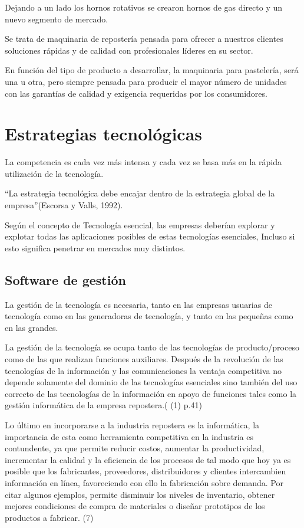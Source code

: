 \documentclass{bmcart}
\begin{document}
Dejando a un lado los hornos rotativos se crearon hornos de gas directo y un nuevo segmento de mercado.

Se trata de maquinaria de repostería pensada para ofrecer a nuestros clientes soluciones rápidas y de calidad con profesionales líderes en su sector. 

En función del tipo de producto a desarrollar, la maquinaria para pastelería, será una u otra, pero siempre pensada para producir el mayor número de unidades con las garantías de calidad y exigencia requeridas por los consumidores.

\section{Estrategias tecnológicas}
La competencia es cada vez más intensa y cada vez se basa más en la rápida utilización de la tecnología.

“La estrategia tecnológica debe encajar dentro de la estrategia global de la empresa”(Escorsa y Valls, 1992).

Según el concepto de Tecnología esencial, las empresas deberían explorar y explotar todas las aplicaciones posibles de estas tecnologías esenciales, Incluso si esto significa penetrar en mercados muy distintos. 

\subsection{Software de gestión}


La gestión de la tecnología es necesaria, tanto en las empresas usuarias de tecnología como en las generadoras de tecnología, y tanto en las pequeñas como en las grandes. 

La gestión de la tecnología se ocupa tanto de las tecnologías de producto/proceso como de las que realizan funciones auxiliares. Después de la revolución de las tecnologías de la información y las comunicaciones la ventaja competitiva no depende solamente del dominio de las tecnologías esenciales sino también del uso correcto de las tecnologías de la información en apoyo de funciones tales como la gestión informática de la empresa repostera.( (1) p.41)

Lo último en incorporarse a la industria repostera es la informática, la importancia de esta como herramienta competitiva en la industria es contundente, ya que permite reducir costos, aumentar la productividad, incrementar la calidad y la eficiencia de los procesos de tal modo que hoy ya es posible que los fabricantes, proveedores, distribuidores y clientes intercambien información en línea, favoreciendo con ello la fabricación sobre demanda.
Por citar algunos ejemplos, permite disminuir los niveles de inventario, obtener mejores condiciones de compra de materiales o diseñar prototipos de los productos a fabricar. (7)
\end{document}

